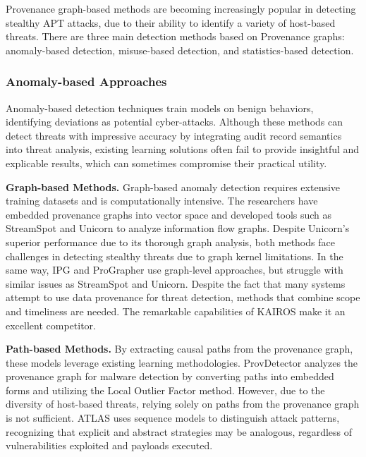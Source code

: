 





Provenance graph-based methods are becoming increasingly popular in detecting stealthy APT attacks, due to their ability to identify a variety of host-based threats. There are three main detection methods based on Provenance graphs: anomaly-based detection, misuse-based detection, and statistics-based detection.

\subsubsection{Anomaly-based Approaches}
Anomaly-based detection techniques train models on benign behaviors, identifying deviations as potential cyber-attacks. Although these methods can detect threats with impressive accuracy by integrating audit record semantics into threat analysis, existing learning solutions often fail to provide insightful and explicable results, which can sometimes compromise their practical utility.

\noindent
{\bf Graph-based Methods.} Graph-based anomaly detection requires extensive training datasets and is computationally intensive. The researchers have embedded provenance graphs into vector space and developed tools such as StreamSpot \cite{manzoor2016fast} and Unicorn \cite{han2020unicorn} to analyze information flow graphs. Despite Unicorn's superior performance due to its thorough graph analysis, both methods face challenges in detecting stealthy threats due to graph kernel limitations. In the same way, IPG \cite{li2021hierarchical} and ProGrapher \cite{yang2023prographer} use graph-level approaches, but struggle with similar issues as StreamSpot and Unicorn. Despite the fact that many systems attempt to use data provenance for threat detection, methods that combine scope and timeliness are needed. The remarkable capabilities of KAIROS \cite{cheng2023kairos} make it an excellent competitor.

\noindent
{\bf Path-based Methods.} By extracting causal paths from the provenance graph, these models leverage existing learning methodologies. ProvDetector \cite{wang2020you} analyzes the provenance graph for malware detection by converting paths into embedded forms and utilizing the Local Outlier Factor method. However, due to the diversity of host-based threats, relying solely on paths from the provenance graph is not sufficient. ATLAS \cite{alsaheel2021atlas}uses sequence models to distinguish attack patterns, recognizing that explicit and abstract strategies may be analogous, regardless of vulnerabilities exploited and payloads executed.

